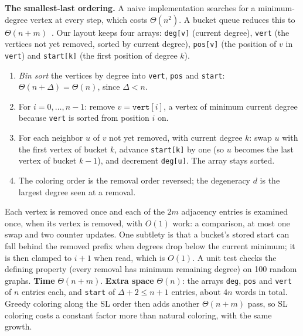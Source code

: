 \documentclass[acmsmall,nonacm]{acmart}
\newcommand{\code}[1]{\texttt{#1}}
\begin{document}
\textbf{The smallest-last ordering.} A naive implementation searches for a
minimum-degree vertex at every step, which costs $\Theta(n^2)$. A bucket queue
reduces this to $\Theta(n+m)$~\cite{matula1983,batagelj2003}. Our layout keeps
four arrays: \code{deg[v]} (current degree), \code{vert} (the vertices not yet
removed, sorted by current degree), \code{pos[v]} (the position of $v$ in
\code{vert}) and \code{start[k]} (the first position of degree $k$).
\begin{enumerate}
  \item \emph{Bin sort} the vertices by degree into \code{vert}, \code{pos} and \code{start}: $\Theta(n+\Delta)=\Theta(n)$, since $\Delta<n$.
  \item For $i=0,\ldots,n-1$: remove $v=\code{vert}[i]$, a vertex of minimum current degree because \code{vert} is sorted from position $i$ on.
  \item For each neighbor $u$ of $v$ not yet removed, with current degree $k$: swap $u$ with the first vertex of bucket $k$, advance \code{start[k]} by one (so $u$ becomes the last vertex of bucket $k-1$), and decrement \code{deg[u]}. The array stays sorted.
  \item The coloring order is the removal order reversed; the degeneracy $d$ is the largest degree seen at a removal.
\end{enumerate}
Each vertex is removed once and each of the $2m$ adjacency entries is examined
once, when its vertex is removed, with $O(1)$ work: a comparison, at most one
swap and two counter updates. One subtlety is that a bucket's stored start can
fall behind the removed prefix when degrees drop below the current minimum; it
is then clamped to $i+1$ when read, which is $O(1)$. A unit test checks the
defining property (every removal has minimum remaining degree) on 100 random
graphs. \textbf{Time} $\Theta(n+m)$. \textbf{Extra space} $\Theta(n)$: the
arrays \code{deg}, \code{pos} and \code{vert} of $n$ entries each, and
\code{start} of $\Delta+2\le n+1$ entries, about $4n$ words in total. Greedy
coloring along the SL order then adds another $\Theta(n+m)$ pass, so SL
coloring costs a constant factor more than natural coloring, with the same
growth.
\end{document}
